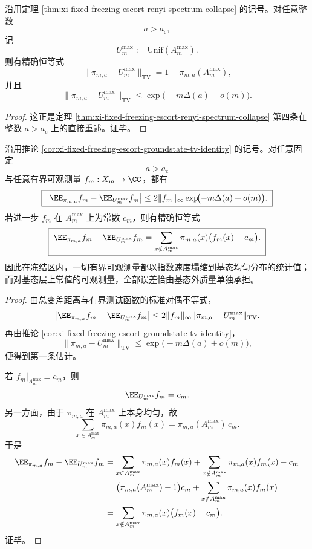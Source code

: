 \begin{corollary}\label{cor:xi-fixed-freezing-escort-groundstate-tv-identity}
沿用定理 \ref{thm:xi-fixed-freezing-escort-renyi-spectrum-collapse} 的记号。对任意整数
\[
a>a_{\mathrm c},
\]
记
\[
U_m^{\max}:=\mathrm{Unif}(A_m^{\max}).
\]
则有精确恒等式
\[
\|\pi_{m,a}-U_m^{\max}\|_{\mathrm{TV}}
=
1-\pi_{m,a}(A_m^{\max}),
\]
并且
\[
\|\pi_{m,a}-U_m^{\max}\|_{\mathrm{TV}}
\le
\exp\!\bigl(-m\Delta(a)+o(m)\bigr).
\]
\end{corollary}
\begin{proof}
这正是定理 \ref{thm:xi-fixed-freezing-escort-renyi-spectrum-collapse} 第四条在整数
\(
a>a_{\mathrm c}
\)
上的直接重述。证毕。
\end{proof}

\begin{theorem}\label{thm:xi-fixed-freezing-escort-bounded-observable-collapse}
沿用推论 \ref{cor:xi-fixed-freezing-escort-groundstate-tv-identity} 的记号。对任意固定
\[
a>a_{\mathrm c}
\]
与任意有界可观测量 \(f_m:X_m\to\CC\)，都有
\[
\boxed{\;
\left|
\EE_{\pi_{m,a}}f_m-\EE_{U_m^{\max}}f_m
\right|
\le
2\|f_m\|_\infty
\exp\!\bigl(-m\Delta(a)+o(m)\bigr).\;}
\]
若进一步 \(f_m\) 在 \(A_m^{\max}\) 上为常数 \(c_m\)，则有精确恒等式
\[
\boxed{\;
\EE_{\pi_{m,a}}f_m-\EE_{U_m^{\max}}f_m
=
\sum_{x\notin A_m^{\max}}\pi_{m,a}(x)\bigl(f_m(x)-c_m\bigr).\;}
\]
因此在冻结区内，一切有界可观测量都以指数速度塌缩到基态均匀分布的统计值；而对基态层上常值的可观测量，全部误差恰由基态外质量单独承担。
\end{theorem}
\begin{proof}
由总变差距离与有界测试函数的标准对偶不等式，
\[
\left|
\EE_{\pi_{m,a}}f_m-\EE_{U_m^{\max}}f_m
\right|
\le
2\|f_m\|_\infty
\|\pi_{m,a}-U_m^{\max}\|_{\mathrm{TV}}.
\]
再由推论 \ref{cor:xi-fixed-freezing-escort-groundstate-tv-identity}，
\[
\|\pi_{m,a}-U_m^{\max}\|_{\mathrm{TV}}
\le
\exp\!\bigl(-m\Delta(a)+o(m)\bigr),
\]
便得到第一条估计。

若 \(f_m|_{A_m^{\max}}\equiv c_m\)，则
\[
\EE_{U_m^{\max}}f_m=c_m.
\]
另一方面，由于 \(\pi_{m,a}\) 在 \(A_m^{\max}\) 上本身均匀，故
\[
\sum_{x\in A_m^{\max}}\pi_{m,a}(x)f_m(x)
=
\pi_{m,a}(A_m^{\max})\,c_m.
\]
于是
\[
\begin{aligned}
\EE_{\pi_{m,a}}f_m-\EE_{U_m^{\max}}f_m
&=
\sum_{x\in A_m^{\max}}\pi_{m,a}(x)f_m(x)
+
\sum_{x\notin A_m^{\max}}\pi_{m,a}(x)f_m(x)-c_m\\
&=
\bigl(\pi_{m,a}(A_m^{\max})-1\bigr)c_m
+
\sum_{x\notin A_m^{\max}}\pi_{m,a}(x)f_m(x)\\
&=
\sum_{x\notin A_m^{\max}}\pi_{m,a}(x)\bigl(f_m(x)-c_m\bigr).
\end{aligned}
\]
证毕。
\end{proof}

